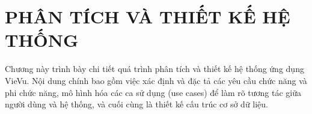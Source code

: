 \chapter{PHÂN TÍCH VÀ THIẾT KẾ HỆ THỐNG}

Chương này trình bày chi tiết quá trình phân tích và thiết kế hệ thống ứng dụng VieVu. Nội dung chính bao gồm việc xác định và đặc tả các yêu cầu chức năng và phi chức năng, mô hình hóa các ca sử dụng (use cases) để làm rõ tương tác giữa người dùng và hệ thống, và cuối cùng là thiết kế cấu trúc cơ sở dữ liệu.





